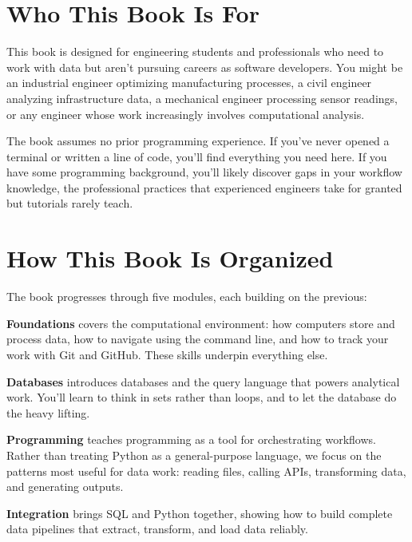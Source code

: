 \documentclass[
  letterpaper,
  DIV=11,
  numbers=noendperiod]{scrreprt}
\begin{document}
\section*{Who This Book Is For}\label{who-this-book-is-for}


This book is designed for engineering students and professionals who
need to work with data but aren't pursuing careers as software
developers. You might be an industrial engineer optimizing manufacturing
processes, a civil engineer analyzing infrastructure data, a mechanical
engineer processing sensor readings, or any engineer whose work
increasingly involves computational analysis.

The book assumes no prior programming experience. If you've never opened
a terminal or written a line of code, you'll find everything you need
here. If you have some programming background, you'll likely discover
gaps in your workflow knowledge, the professional practices that
experienced engineers take for granted but tutorials rarely teach.

\section*{How This Book Is Organized}\label{how-this-book-is-organized}


The book progresses through five modules, each building on the previous:

\textbf{Foundations} covers the computational environment: how computers
store and process data, how to navigate using the command line, and how
to track your work with Git and GitHub. These skills underpin everything
else.

\textbf{Databases} introduces databases and the query language that
powers analytical work. You'll learn to think in sets rather than loops,
and to let the database do the heavy lifting.

\textbf{Programming} teaches programming as a tool for orchestrating
workflows. Rather than treating Python as a general-purpose language, we
focus on the patterns most useful for data work: reading files, calling
APIs, transforming data, and generating outputs.

\textbf{Integration} brings SQL and Python together, showing how to
build complete data pipelines that extract, transform, and load data
reliably.
\end{document}
